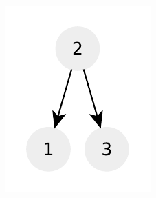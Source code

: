 \begin{figure}
\begin{subfigure}[t]{0.30\textwidth}
		\includegraphics[width=1\linewidth]{sources/verify_BST/images/example3}
		\label{fig:verify:example3}
	 \end{subfigure}
	 \hfill
	 \begin{subfigure}[t]{0.30\textwidth}

\end{subfigure}
\end{figure}
